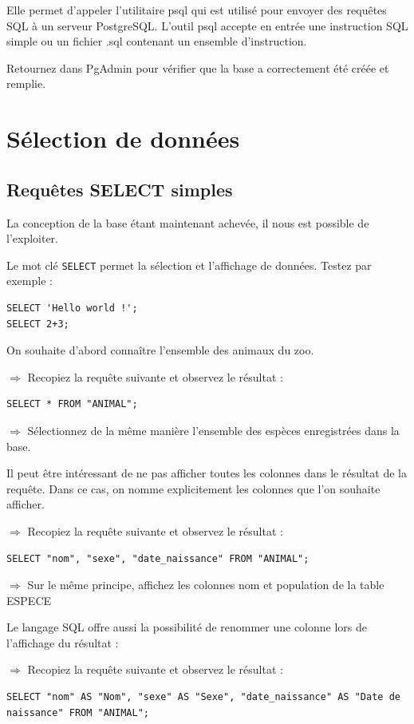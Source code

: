 \documentclass[11pt]{article}
\newcommand{\action}{$\Rightarrow$ }
\begin{document}
				Elle permet d'appeler l'utilitaire psql qui est utilisé pour envoyer des requêtes SQL à un serveur PostgreSQL. L'outil psql accepte en entrée une instruction SQL simple ou un fichier .sql contenant un ensemble d'instruction. 

Retournez dans PgAdmin pour vérifier que la base a correctement été créée et remplie.


\section{Sélection de données}
\subsection{Requêtes SELECT simples}
La conception de la base étant maintenant achevée, il nous est possible de l'exploiter.

Le mot clé \lstinline{SELECT} permet la sélection et l'affichage de données. Testez par exemple :
\begin{lstlisting}
SELECT 'Hello world !';
SELECT 2+3;
\end{lstlisting}

On souhaite d'abord connaître l'ensemble des animaux du zoo.

\action Recopiez la requête suivante et observez le résultat :
\begin{lstlisting}
SELECT * FROM "ANIMAL";
\end{lstlisting}

\action Sélectionnez de la même manière l'ensemble des espèces enregistrées dans la base.

Il peut être intéressant de ne pas afficher toutes les colonnes dans le résultat de la requête. Dans ce cas, on nomme explicitement les colonnes que l'on souhaite afficher.

\action Recopiez la requête suivante et observez le résultat :
\begin{lstlisting}
SELECT "nom", "sexe", "date_naissance" FROM "ANIMAL";
\end{lstlisting}

\action Sur le même principe, affichez les colonnes nom et population de la table ESPECE

	Le langage SQL offre aussi la possibilité de renommer une colonne lors de l'affichage du résultat :
	
\action Recopiez la requête suivante et observez le résultat :
\begin{lstlisting}
SELECT "nom" AS "Nom", "sexe" AS "Sexe", "date_naissance" AS "Date de naissance" FROM "ANIMAL";
\end{lstlisting}
 
\end{document}
